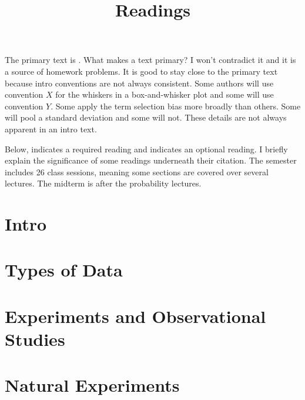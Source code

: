 \documentclass[12pt]{article}
\title{Readings \\ \scalebox{0.6}{Stats 1101 \semester} } %
\date{}
\begin{document}
\maketitle


The primary text is \cite{freedman2007statistics}. What makes a text primary? I won't contradict it and it is a source of homework problems. It is good to stay close to the primary text because intro conventions are not always consistent. Some authors will use convention $X$ for the whiskers in a box-and-whisker plot and some will use convention $Y$. Some apply the term selection bias more broadly than others. Some will pool a standard deviation and some will not. These details are not always apparent in an intro text. 

Below, \scalebox{0.6}{\faToggleOn} indicates a required reading and \scalebox{0.6}{\faToggleOff} indicates an optional reading. I briefly explain the significance of some readings underneath their citation. The semester includes 26 class sessions, meaning some sections are covered over several lectures. The midterm is after the probability lectures.

\section{Intro}



\section{Types of Data}



\section{Experiments and Observational Studies}


\section{Natural Experiments}

\end{document}
